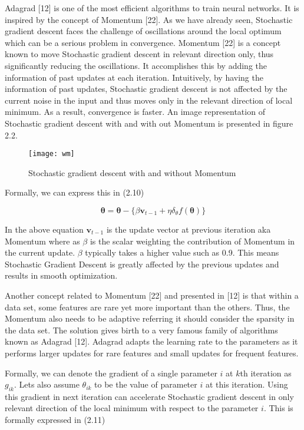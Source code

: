 Adagrad [12] is one of the most efficient algorithms to train neural networks. It is inspired by the concept of Momentum [22]. As we have already seen, Stochastic gradient descent faces the challenge of oscillations around the local optimum which can be a serious problem in convergence. Momentum [22] is a concept known to move Stochastic gradient descent in relevant direction only, thus significantly reducing the oscillations. It accomplishes this by adding the information of past updates at each iteration. Intuitively, by having the information of past updates, Stochastic gradient descent is not affected by the current noise in the input and thus moves only in the relevant direction of local minimum. As a result, convergence is faster. An image representation of Stochastic gradient descent with and with out Momentum is presented in figure 2.2.

\begin{figure}
\centering
\texttt{[image: wm]}
\caption{Stochastic gradient descent with and without Momentum}
\end{figure} 
    
Formally, we can express this in (2.10)

\begin{equation}
\bm{\theta} = \bm{\theta} - \lbrace \beta \textbf{v}_{t-1}+\eta \delta_\theta f(\bm{\theta}) \rbrace
\end{equation}

In the above equation $\textbf{v}_ {t-1}$ is the update vector at previous iteration aka Momentum where as $\beta$ is the scalar weighting the contribution of Momentum in the current update. $\beta$ typically takes a higher value such as 0.9. This means Stochastic Gradient Descent is greatly affected by the previous updates and results in smooth optimization.

Another concept related to Momentum [22] and presented in [12] is that within a data set, some features are rare yet more important than the others. Thus, the Momentum also needs to be adaptive referring it should consider the sparsity in the data set. The solution gives birth to a very famous family of algorithms known as Adagrad [12]. Adagrad adapts the learning rate to the parameters as it performs larger updates for rare features and small updates for frequent features. 

Formally, we can denote the gradient of a single parameter $i$ at $k$th iteration as $g_{ik}$. Lets also assume $\theta_{ik}$ to be the value of parameter $i$ at this iteration. Using this gradient in next iteration can accelerate Stochastic gradient descent in only relevant direction of the local minimum with respect to the parameter $i$. This is formally expressed in (2.11)

